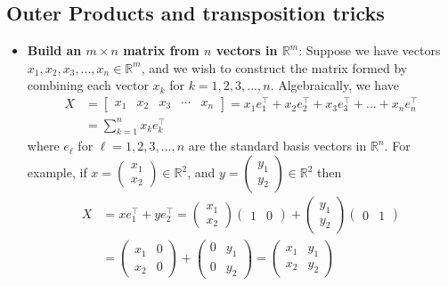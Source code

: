 \documentclass{report}
\begin{document}
    \pagebreak 
    \subsection{Outer Products and transposition tricks}
    \begin{itemize}
        \item \textbf{Build an $m\times n$ matrix from $n$ vectors in $\mathbb{R}^{m}$}: Suppose we have vectors $x_{1}, x_{2}, x_{3}, ..., x_{n} \in \mathbb{R}^{m}$, and we wish to construct the matrix formed by combining each vector $x_{k}$ for $k=1,2,3,...,n$. Algebraically, we have
            \begin{align*}
                X &= \begin{bmatrix} x_{1} & x_{2} & x_{3} & \cdots & x_{n} \end{bmatrix} = x_{1}e_{1}^{\top} + x_{2}e_{2}^{\top} + x_{3}e_{3}^{\top} + ... + x_{n}e_{n}^{\top} \\
                  &= \sum_{k=1}^{n}x_{k}e_{k}^{\top}
            \end{align*}
            where $e_{\ell}$ for $\ell = 1,2,3,...,n$ are the standard basis vectors in $\mathbb{R}^{n} $.
            \bigbreak \noindent 
            For example, if $x = \begin{pmatrix} x_{1} \\ x_{2} \end{pmatrix} \in \mathbb{R}^{2}$, and $y = \begin{pmatrix} y_{1} \\ y_{2} \end{pmatrix} \in \mathbb{R}^{2}$ then
            \begin{align*}
                X &= xe_{1}^{\top} + ye_{2}^{\top} = \begin{pmatrix} x_{1} \\ x_{2} \end{pmatrix} \begin{pmatrix} 1  & 0 \end{pmatrix} + \begin{pmatrix} y_{1} \\ y_{2} \end{pmatrix} \begin{pmatrix} 0 & 1 \end{pmatrix} \\
                  &= \begin{pmatrix} x_{1} & 0 \\ x_{2} & 0 \end{pmatrix} + \begin{pmatrix} 0& y_{1} \\ 0 & y_{2} \end{pmatrix} = \begin{pmatrix} x_{1} & y_{1} \\ x_{2} & y_{2} \end{pmatrix}

\end{align*}
\end{itemize}
\end{document}

